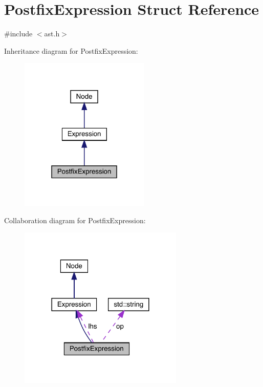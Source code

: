 \hypertarget{struct_postfix_expression}{}\section{Postfix\+Expression Struct Reference}
\label{struct_postfix_expression}


{\ttfamily \#include $<$ast.\+h$>$}



Inheritance diagram for Postfix\+Expression\+:\nopagebreak
\begin{figure}[H]
\begin{center}
\leavevmode
\includegraphics[width=175pt]{struct_postfix_expression__inherit__graph}
\end{center}
\end{figure}


Collaboration diagram for Postfix\+Expression\+:\nopagebreak
\begin{figure}[H]
\begin{center}
\leavevmode
\includegraphics[width=222pt]{struct_postfix_expression__coll__graph}
\end{center}
\end{figure}
